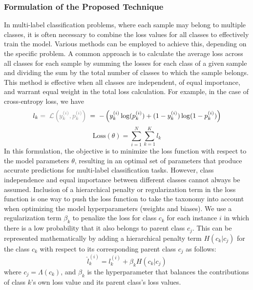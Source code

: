 \documentclass[authoryear,preprint,review,12pt]{elsarticle}
\begin{document}
\subsubsection{Formulation of the Proposed Technique}
In multi-label classification problems, where each sample may belong to multiple classes, it is often necessary to combine the loss values for all classes to effectively train the model. Various methods can be employed to achieve this, depending on the specific problem. A common approach is to calculate the average loss across all classes for each sample by summing the losses for each class of a given sample and dividing the sum by the total number of classes to which the sample belongs. This method is effective when all classes are independent, of equal importance, and warrant equal weight in the total loss calculation. For example, in the case of cross-entropy loss, we have
\begin{equation}
    l_k \textcolor{gray}{\; = \; \mathcal{L} \left(y_k^{(i)},p_k^{(i)}\right)} \; = \; -\left(y_k^{(i)}\log(p_k^{(i)}) + (1 - y_k^{(i)})\log(1 - p_k^{(i)})\right)
    \label{eq:taxonomy.eq.2.loss}
\end{equation}
\begin{equation}
    \text{Loss}(\theta) = \sum_{i=1}^{N}\sum_{k=1}^{K}l_k
    \label{eq:taxonomy.eq.3.totalloss}
\end{equation}
In this formulation, the objective is to minimize the loss function with respect to the model parameters $\theta $, resulting in an optimal set of parameters that produce accurate predictions for multi-label classification tasks. However, class independence and equal importance between different classes cannot always be assumed. Inclusion of a hierarchical penalty or regularization term in the loss function is one way to push the loss function to take the taxonomy into account when optimizing the model hyperparameters (weights and biases). We use a regularization term $\beta_k$  to penalize the loss for class $c_k$ for each instance $i $ in which there is a low probability that it also belongs to parent class $c_j$. This can be represented mathematically by adding a hierarchical penalty term $H(c_k \vert c_j)$ for the class $c_k$ with respect to its corresponding parent class $c_j$ as follows:
\begin{equation}
    \widehat{l}_{k}^{(i)} = l_{k}^{(i)}+\beta_k H \left(c_k \vert c_j \right)
    \label{eq:taxonomy.eq.3.newloss}
\end{equation}
where $c_j=\Lambda(c_k)$, and $\beta_k $ is the hyperparameter that balances the contributions of class $k$'s own loss value and its parent class's loss values.
\end{document}
